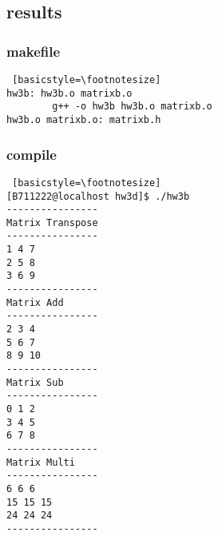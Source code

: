 \documentclass[twoside,twocolumn]{article}
\begin{document}
\subsection{results}
\subsubsection{makefile}
\begin{lstlisting} [basicstyle=\footnotesize]
hw3b: hw3b.o matrixb.o
        g++ -o hw3b hw3b.o matrixb.o
hw3b.o matrixb.o: matrixb.h
\end{lstlisting}

\subsubsection{compile}
\begin{lstlisting} [basicstyle=\footnotesize]
[B711222@localhost hw3d]$ ./hw3b
----------------
Matrix Transpose
----------------
1 4 7
2 5 8
3 6 9
----------------
Matrix Add
----------------
2 3 4
5 6 7
8 9 10
----------------
Matrix Sub
----------------
0 1 2
3 4 5
6 7 8
----------------
Matrix Multi
----------------
6 6 6
15 15 15
24 24 24
----------------
\end{lstlisting}


\end{document}

